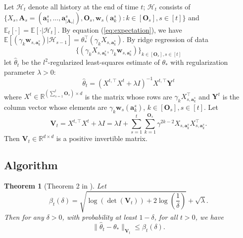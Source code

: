 \documentclass{article}
\newcommand{\bA}{\mathbf{A}}
\newcommand{\ba}{\mathbf{a}}
\newcommand{\bO}{\mathbf{O}}
\newcommand{\bV}{\mathbf{V}}
\newcommand{\bw}{\mathbf{w}}
\newcommand{\bY}{\mathbf{Y}}
\newcommand{\cH}{\mathcal{H}}
\newcommand{\EE}{\mathbb{E}}
\newcommand{\RR}{\mathbb{R}}
\newcommand{\abs}[1]{\left| #1 \right|}
\newcommand{\norm}[1]{\| #1 \|}
\newtheorem{theorem}{Theorem}[section]
\begin{document}
Let $\cH_t$ denote all history at the end of time $t$; $\cH_t$ consists of $\{X_s, \bA_s=(\ba_{1}^s,...,\ba_{\abs{\bA_s}}^s), \bO_s, \bw_s(\ba_k^s): k \in[\bO_s], s\in[t] \}$ and $\EE_t[\cdot] = \EE[\cdot | \cH_t]$. By equation (\ref{eq:expectation}), we have $\EE[(\gamma_k\bw_{s,\ba_k^s}) | \cH_{s-1}] = \theta_*^{\top} (\gamma_k X_{s,\ba_k^s})$. By ridge regression of data 
$$
\{(\gamma_k X_{s,\ba_k^s}, \gamma_k\bw_{s,\ba_k^s})\}_{k \in[\bO_s], s\in[t]}
$$
	let $\hat{\theta}_t$ be the $l^2$-regularized least-squares estimate of $\theta_*$ with regularization parameter $\lambda > 0$:
	\begin{equation}
	\hat{\theta}_t = (X^{t,\top}X^{t} + \lambda I)^{-1} X^{t, \top} \bY^t
	\end{equation}
	where $X^t \in \RR^{(\sum_{s=1}^{t}\bO_s) \times d}$ is the matrix whose rows are $\gamma_k X_{s,\ba_k^s}^{\top}$ and $\bY^t$ is the column vector whose elements are $\gamma_k \bw_s(\ba_k^s)$, $k \in[\bO_s], s\in[t]$. Let
	$$
	\bV_t = X^{t,\top}X^{t} + \lambda I = \lambda I + \sum_{s=1}^{t} \sum_{k=1}^{\bO_s} \gamma^{2k-2}X_{s,\ba_k^s}X_{s,\ba_k^s}^{\top}.
	$$
	Then $\bV_t \in \RR^{d \times d}$ is a positive invertible matrix.
	\subsection{Algorithm}
	
	\begin{theorem}[Theorem 2 in \cite{abbasi2011improved}]
		\label{thm:theta_estimate}
		Let 
		$$
		\beta_{t}(\delta) = \sqrt{\log(\det(\bV_{t})) + 2 \log(\frac{1}{\delta})} + \sqrt{\lambda}.
		$$
		Then for any $\delta > 0$, with probability at least $1 - \delta$, for all $t > 0$, we have
		\begin{equation}
		\norm{\hat{\theta}_t - \theta_*}_{\bV_{t}} \leq \beta_{t}(\delta).
		\end{equation}
	\end{theorem}
	
\end{document}
